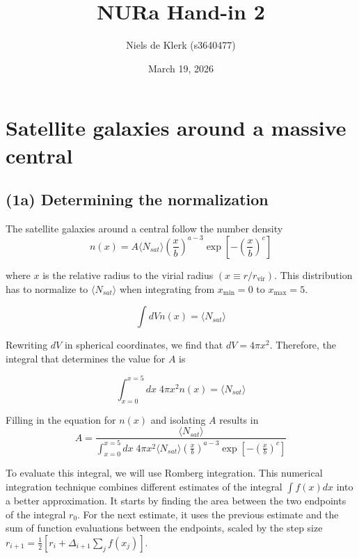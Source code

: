 \documentclass{article}
\title{NURa Hand-in 2}
\author{Niels de Klerk (s3640477)}
\date{March 19, 2026}
\begin{document}
\maketitle


\section{Satellite galaxies around a massive central}

\subsection{(1a) Determining the normalization}
The satellite galaxies around a central follow the number density
\begin{equation}
    n(x) = A\langle N_{sat}\rangle\left(\frac{x}{b}\right)^{a-3}\exp\left[-\left(\frac{x}{b}\right)^c\right]
\end{equation}

where $x$ is the relative radius to the virial radius $(x\equiv r/r_\mathrm{vir})$. This distribution has to normalize to $\langle N_{sat}\rangle$ when integrating from $x_\mathrm{min}=0$ to $x_\mathrm{max}=5$. 

\begin{equation}
    \int dV n(x) = \langle N_{sat}\rangle
\end{equation}

Rewriting $dV$ in spherical coordinates, we find that $dV = 4\pi x^2$. Therefore, the integral that determines the value for $A$ is

\begin{equation}
    \int_{x=0}^{x=5} dx\; 4\pi x^2n(x) = \langle N_{sat}\rangle
\end{equation}

Filling in the equation for $n(x)$ and isolating $A$ results in
\begin{equation}\label{eq:normalization constant}
    A = \frac{\langle N_{sat}\rangle}{\int_{x=0}^{x=5} dx\; 4\pi x^2 \langle N_{sat}\rangle\left(\frac{x}{b}\right)^{a-3}\exp\left[-\left(\frac{x}{b}\right)^c\right]}
\end{equation}

To evaluate this integral, we will use Romberg integration. This numerical integration technique combines different estimates of the integral $\int f(x)dx$ into a better approximation. It starts by finding the area between the two endpoints of the integral $r_0$. For the next estimate, it uses the previous estimate and the sum of function evaluations between the endpoints, scaled by the step size $r_{i+1}=\frac{1}{2}\left[r_i+\Delta_{i+1}\sum_j f (x_j)\right]$. 
\end{document}
